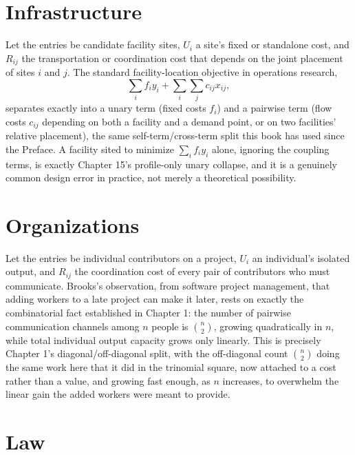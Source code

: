 \documentclass[11pt]{book}
\begin{document}
\section{Infrastructure}

Let the entries be candidate facility sites, $U_i$ a site's fixed or standalone cost, and $R_{ij}$ the transportation or coordination cost that depends on the joint placement of sites $i$ and $j$. The standard facility-location objective in operations research,
\[
\sum_i f_iy_i + \sum_i\sum_j c_{ij}x_{ij},
\]
separates exactly into a unary term (fixed costs $f_i$) and a pairwise term (flow costs $c_{ij}$ depending on both a facility and a demand point, or on two facilities' relative placement), the same self-term/cross-term split this book has used since the Preface. A facility sited to minimize $\sum_if_iy_i$ alone, ignoring the coupling terms, is exactly Chapter 15's profile-only unary collapse, and it is a genuinely common design error in practice, not merely a theoretical possibility.

\section{Organizations}

Let the entries be individual contributors on a project, $U_i$ an individual's isolated output, and $R_{ij}$ the coordination cost of every pair of contributors who must communicate. Brooks's observation, from software project management, that adding workers to a late project can make it later, rests on exactly the combinatorial fact established in Chapter 1: the number of pairwise communication channels among $n$ people is $\binom{n}{2}$, growing quadratically in $n$, while total individual output capacity grows only linearly. This is precisely Chapter 1's diagonal/off-diagonal split, with the off-diagonal count $\binom{n}{2}$ doing the same work here that it did in the trinomial square, now attached to a cost rather than a value, and growing fast enough, as $n$ increases, to overwhelm the linear gain the added workers were meant to provide.

\section{Law}
\end{document}
